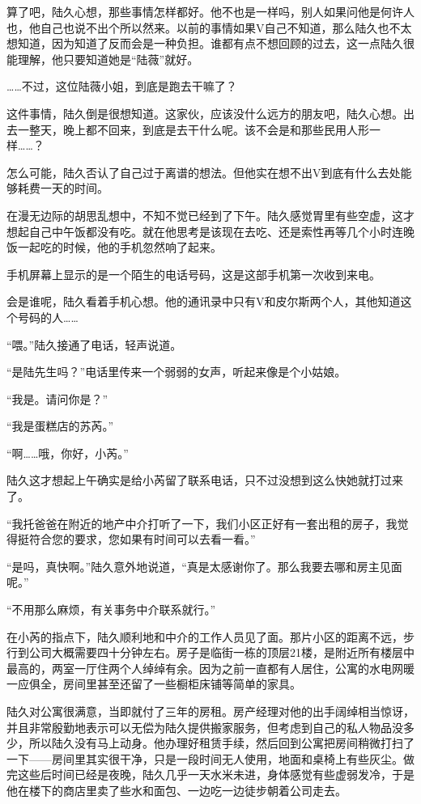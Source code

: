 算了吧，陆久心想，那些事情怎样都好。他不也是一样吗，别人如果问他是何许人也，他自己也说不出个所以然来。以前的事情如果V自己不知道，那么陆久也不太想知道，因为知道了反而会是一种负担。谁都有点不想回顾的过去，这一点陆久很能理解，他只要知道她是“陆薇”就好。

……不过，这位陆薇小姐，到底是跑去干嘛了？

这件事情，陆久倒是很想知道。这家伙，应该没什么远方的朋友吧，陆久心想。出去一整天，晚上都不回来，到底是去干什么呢。该不会是和那些民用人形一样……？

怎么可能，陆久否认了自己过于离谱的想法。但他实在想不出V到底有什么去处能够耗费一天的时间。

在漫无边际的胡思乱想中，不知不觉已经到了下午。陆久感觉胃里有些空虚，这才想起自己中午饭都没有吃。就在他思考是该现在去吃、还是索性再等几个小时连晚饭一起吃的时候，他的手机忽然响了起来。

手机屏幕上显示的是一个陌生的电话号码，这是这部手机第一次收到来电。

会是谁呢，陆久看着手机心想。他的通讯录中只有V和皮尔斯两个人，其他知道这个号码的人……

“喂。”陆久接通了电话，轻声说道。

“是陆先生吗？”电话里传来一个弱弱的女声，听起来像是个小姑娘。

“我是。请问你是？”

“我是蛋糕店的苏芮。”

“啊……哦，你好，小芮。”

陆久这才想起上午确实是给小芮留了联系电话，只不过没想到这么快她就打过来了。

“我托爸爸在附近的地产中介打听了一下，我们小区正好有一套出租的房子，我觉得挺符合您的要求，您如果有时间可以去看一看。”

“是吗，真快啊。”陆久意外地说道，“真是太感谢你了。那么我要去哪和房主见面呢。”

“不用那么麻烦，有关事务中介联系就行。”

在小芮的指点下，陆久顺利地和中介的工作人员见了面。那片小区的距离不远，步行到公司大概需要四十分钟左右。房子是临街一栋的顶层21楼，是附近所有楼层中最高的，两室一厅住两个人绰绰有余。因为之前一直都有人居住，公寓的水电网暖一应俱全，房间里甚至还留了一些橱柜床铺等简单的家具。

陆久对公寓很满意，当即就付了三年的房租。房产经理对他的出手阔绰相当惊讶，并且非常殷勤地表示可以无偿为陆久提供搬家服务，但考虑到自己的私人物品没多少，所以陆久没有马上动身。他办理好租赁手续，然后回到公寓把房间稍微打扫了一下——房间里其实很干净，只是一段时间无人使用，地面和桌椅上有些灰尘。做完这些后时间已经是夜晚，陆久几乎一天水米未进，身体感觉有些虚弱发冷，于是他在楼下的商店里卖了些水和面包、一边吃一边徒步朝着公司走去。




